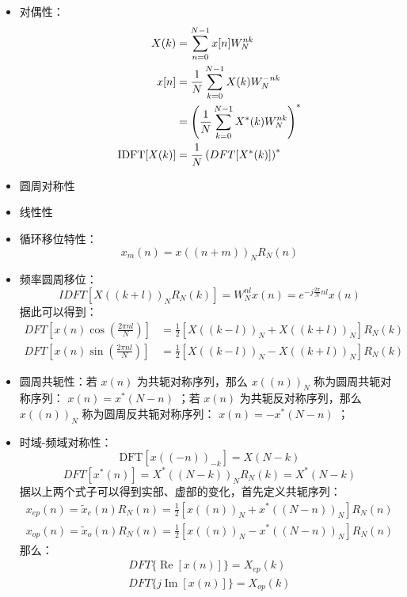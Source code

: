 \documentclass[cn,11pt,chinese,black,simple]{elegantbook}
\begin{document}
\begin{itemize}
    \item 对偶性：\[\begin{aligned}
        X(k) &= \displaystyle\sum_{n = 0}^{N-1} x[n] W_N^{nk} \\
        x[n] &= \frac{1}{N} \displaystyle\sum_{k=0}^{N-1} X(k) W_N^{-nk} \\ 
        &= \left(\frac{1}{N} \displaystyle\sum_{k=0}^{N-1} X^*(k) W_N^{nk}\right)^* \\ 
        \text{IDFT}[X(k)] &= \frac{1}{N} \left(DFT[X^*(k)]\right)^*
    \end{aligned}\]
    \item 圆周对称性
    \item 线性性
    \item 循环移位特性：\[
        x_{m}(n)=x((n+m))_{N} R_{N}(n)
        \]
    \item 频率圆周移位： \[
        I D F T\left[X((k+l))_{N} R_{N}(k)\right]=W_{N}^{n l} x(n)=e^{-j \frac{2 \pi}{N} n l} x(n)
        \]
    据此可以得到：\[
        \begin{aligned}
        D F T\left[x(n) \cos \left(\frac{2 \pi n l}{N}\right)\right] &=\frac{1}{2}\left[X((k-l))_{N}+X((k+l))_{N}\right] R_{N}(k) \\
        D F T\left[x(n) \sin \left(\frac{2 \pi n l}{N}\right)\right] &=\frac{1}{2}\left[X((k-l))_{N}-X((k+l))_{N}\right] R_{N}(k)
        \end{aligned}
    \]
    \item 圆周共轭性：若 \(x(n)\) 为共轭对称序列，那么 \(x((n))_N\) 称为圆周共轭对称序列： \(x(n) = x^*(N-n)\) ；若 \(x(n)\) 为共轭反对称序列，那么 \(x((n))_N\) 称为圆周反共轭对称序列： \(x(n) = -x^*(N-n)\) ；
    \item 时域-频域对称性： \[\text{DFT}[x((-n))_{-k}] = X(N - k)\] 
        \[
    D F T\left[x^{*}(n)\right]=X^{*}((N-k))_{N} R_{N}(k)=X^{*}(N-k)
    \]
    据以上两个式子可以得到实部、虚部的变化，首先定义共轭序列：
        \[
    \begin{array}{l}
    x_{e p}(n)=\tilde{x}_{e}(n) R_{N}(n)=\frac{1}{2}\left[x((n))_{N}+x^{*}((N-n))_{N}\right] R_{N}(n) \\
    x_{o p}(n)=\tilde{x}_{o}(n) R_{N}(n)=\frac{1}{2}\left[x((n))_{N}-x^{*}((N-n))_{N}\right] R_{N}(n)
    \end{array}
    \]
    那么： 
        \[
    \begin{array}{l}
    DFT \{\operatorname{Re} [x(n)]\} = X_{ep}(k) \\ 
    D F T\{j \operatorname{Im}[x(n)]\}=X_{o p}(k) \\

\end{array}\]
\end{itemize}
\end{document}
